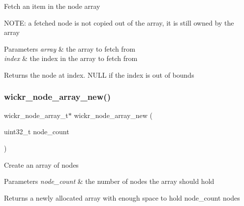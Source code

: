 Fetch an item in the node array

N\+O\+TE\+: a fetched node is not copied out of the array, it is still owned by the array


\begin{DoxyParams}{Parameters}
{\em array} & the array to fetch from \\
\hline
{\em index} & the index in the array to fetch from \\
\hline
\end{DoxyParams}
\begin{DoxyReturn}{Returns}
the node at \textquotesingle{}index\textquotesingle{}. N\+U\+LL if the index is out of bounds 
\end{DoxyReturn}
\mbox{\label{group__wickr__node_ga504ebe707aa003032c4ac8044d73ee92}} 
\subsubsection{\texorpdfstring{wickr\+\_\+node\+\_\+array\+\_\+new()}{wickr\_node\_array\_new()}}
{\footnotesize\ttfamily wickr\+\_\+node\+\_\+array\+\_\+t$\ast$ wickr\+\_\+node\+\_\+array\+\_\+new (\begin{DoxyParamCaption}\item[{uint32\+\_\+t}]{node\+\_\+count }\end{DoxyParamCaption})}

Create an array of nodes


\begin{DoxyParams}{Parameters}
{\em node\+\_\+count} & the number of nodes the array should hold \\
\hline
\end{DoxyParams}
\begin{DoxyReturn}{Returns}
a newly allocated array with enough space to hold \textquotesingle{}node\+\_\+count\textquotesingle{} nodes 
\end{DoxyReturn}
\mbox{\label{group__wickr__node_gae511a75489982fc2e90271be63d9d753}} 
